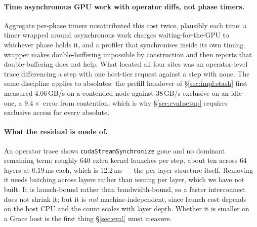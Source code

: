 \paragraph{Time asynchronous GPU work with operator diffs, not phase timers.}
Aggregate per-phase timers misattributed this cost twice, plausibly each time: a
timer wrapped around asynchronous work charges waiting-for-the-GPU to whichever
phase holds it, and a profiler that synchronises inside its own timing wrapper
makes double-buffering impossible by construction and then reports that
double-buffering does not help. What located all four sites was an
operator-level trace differencing a step with one host-tier request against a
step with none. The same discipline applies to absolutes: the prefill handover of \S\ref{sec:impl:stash}
first measured 4.06\,GB/s on a contended node against 38\,GB/s exclusive on an
idle one, a $9.4\times$ error from contention, which is why
\S\ref{sec:eval:setup} requires exclusive access for every absolute.

\paragraph{What the residual is made of.} An operator trace shows
\texttt{cudaStreamSynchronize} gone and no dominant remaining term: roughly 640
extra kernel launches per step, about ten across 64 layers at 0.19\,ms each,
which is 12.2\,ms --- the per-layer structure itself. Removing it needs batching
across layers rather than issuing per layer, which we have not built. It is
launch-bound rather than bandwidth-bound, so a faster interconnect does not
shrink it; but it is \emph{not} machine-independent, since launch cost depends on
the host CPU and the count scales with layer depth. Whether it is smaller on a
Grace host is the first thing \S\ref{sec:eval} must measure.
